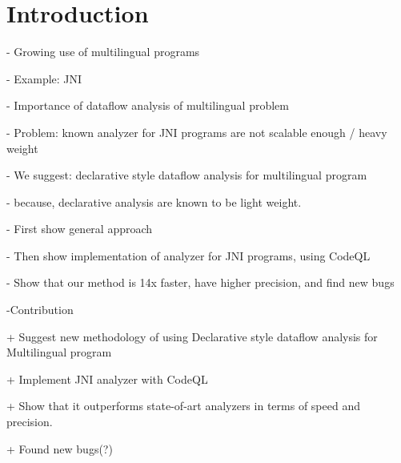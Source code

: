 \section{Introduction}
- Growing use of multilingual programs

- Example: JNI

- Importance of dataflow analysis of multilingual problem

- Problem: known analyzer for JNI programs are not scalable enough / heavy weight

- We suggest: declarative style dataflow analysis for multilingual program

- because, declarative analysis are known to be light weight.

- First show general approach

- Then show implementation of analyzer for JNI programs, using CodeQL

- Show that our method is 14x faster, have higher precision, and find new bugs

-Contribution

+ Suggest new methodology of using Declarative style dataflow analysis for Multilingual program

+ Implement JNI analyzer with CodeQL

+ Show that it outperforms state-of-art analyzers in terms of speed and precision.

+ Found new bugs(?)
